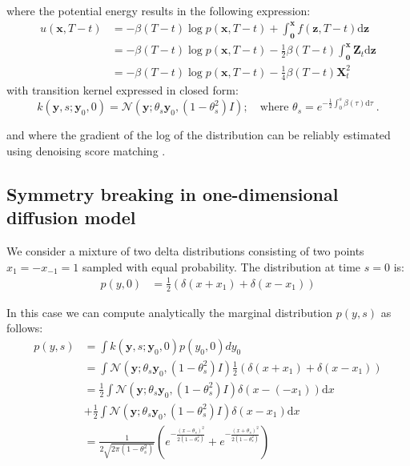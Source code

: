 where the potential energy results in the following expression:
\begin{align}
u(\mathbf{x}, T- t) &=  -\beta(T-t) \log  p(\mathbf{x}, T-t)  + \int_{\mathbf{0}}^\mathbf{x} f(\mathbf{z}, T-t) \text{d}\mathbf{z} \nonumber\\
&=  -\beta(T-t) \log  p(\mathbf{x}, T-t)  -\frac{1}{2} \beta(T-t) \int_{\mathbf{0}}^\mathbf{x} \mathbf{Z}_t\text{d}\mathbf{z} \nonumber\\
&=  -\beta(T-t) \log  p(\mathbf{x}, T-t)  -\frac{1}{4} \beta(T-t)  \mathbf{X}_t^2
\end{align}
with transition kernel expressed in closed form:
\begin{equation}
    k(\mathbf{y}, s; \mathbf{y}_0, 0) = \mathcal{N}\left(\mathbf{y}; \theta_{s} \mathbf{y}_0, (1 - \theta_{s}^2) I \right); \quad \text{where } \theta_s = e^{-\frac{1}{2} \int_0^s \beta(\tau) \text{d} \tau}~.
\end{equation}

and where the gradient of the log of the distribution can be reliably estimated using denoising score matching \citep{song2021scorebased, ho2020denoising, vincent2011connection}.


\subsection{Symmetry breaking in one-dimensional diffusion model}
\label{supp:1d_calculation}

We consider a mixture of two delta distributions consisting of two points $x_1 = -x_{-1} = 1$ sampled with equal probability. The distribution at time $s=0$ is:
\begin{align*}
    p(y,0) &= \frac{1}{2}\left(\delta(x+x_1)+\delta(x-x_1)\right)
\end{align*}

In this case we can compute analytically the marginal distribution $p(y, s)$ as follows:
\begin{align}
    p(y, s) &= \int k(\mathbf{y}, s; \mathbf{y}_0, 0) p(y_0, 0) dy_0  \nonumber\\
            &= \int\mathcal{N}\left(\mathbf{y}; \theta_{s} \mathbf{y}_0, (1 - \theta_{s}^2) I \right)  \frac{1}{2}\left(\delta(x+x_1)+\delta(x-x_1)\right)  \nonumber\\
            &= \frac{1}{2} \int \mathcal{N}\left(\mathbf{y}; \theta_{s} \mathbf{y}_0, (1 - \theta_{s}^2) I \right) \delta(x-(-x_1)) \mathrm{d}x   \nonumber\\
            &+ \frac{1}{2} \int \mathcal{N}\left(\mathbf{y}; \theta_{s} \mathbf{y}_0, (1 - \theta_{s}^2) I \right) \delta(x-x_1) \mathrm{d}x   \nonumber\\
            &= \frac{1}{2\sqrt{2\pi (1 - \theta_{s}^2) }}\left(e^{-\frac{(x- \theta_s)^2}{2(1 - \theta_{s}^2)}} + e^{-\frac{(x + \theta_s)^2}{2(1 - \theta_{s}^2)}}\right)
\end{align}

